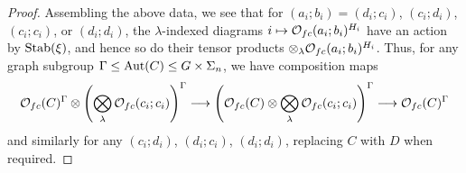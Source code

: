 \documentclass[a4paper,10pt
,draft
]{article}%
\renewcommand{\1}{\eta}%
\begin{document}
\begin{proof}
      Assembling the above data, 
      we see that for $(a_i;b_i) = (d_i;c_i)$, $(c_i;d_i)$, $(c_i;c_i)$, or $(d_i;d_i)$,
      the $\lambda$-indexed diagrams $i \mapsto \mathcal{O}_{f c}(a_i;b_i)^{H_i}$
      have an action by $\mathrm{Stab}(\xi)$,
      and hence so do their tensor products $\otimes_\lambda \mathcal{O}_{f c}(a_i;b_i)^{H_i}$.
      Thus, for any graph subgroup $\Gamma \leq \operatorname{Aut}(C) \leq G \times \Sigma_n$,
      we have composition maps
      \begin{equation}
            \mathcal{O}_{f c}(C)^{\Gamma} \otimes \left(
                  \bigotimes\limits_\lambda \mathcal{O}_{f c}(c_i;c_i)
            \right)^{\Gamma}
            \longrightarrow
            \left(
                  \mathcal{O}_{f c}(C) \otimes \bigotimes\limits_\lambda \mathcal{O}_{f c}(c_i;c_i)
            \right)^\Gamma
            \longrightarrow
            \mathcal{O}_{f c}(C)^\Gamma
      \end{equation}
      and similarly for any $(c_i;d_i)$, $(d_i;c_i)$, $(d_i;d_i)$,
      replacing $C$ with $D$ when required.
      

\end{proof}
\end{document}
